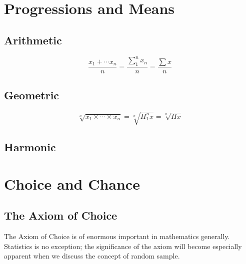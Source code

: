 \chapter{Progressions and Means}

\section{Arithmetic}
\label{sect:meanarith}

\begin{definition}
  
\end{definition}

\begin{definition}
  \[\dfrac{x_1+\cdots x_n}{n} = \dfrac{\sum_1^n x_n}{n} = \dfrac{\displaystyle\sum x}{n}\]
\end{definition}

\section{Geometric}
\label{sect:meangeom}

\begin{definition}
  
\end{definition}

\begin{definition}
  \[\sqrt[n]{x_1\times\cdots\times x_n} = \sqrt[n]{\displaystyle\Pi_1^n x} = \sqrt[n]{\displaystyle\Pi x}\]
\end{definition}
\section{Harmonic}
\label{sect:meanharmonic}

\chapter{Choice and Chance}

\section{The Axiom of Choice}

The Axiom of Choice is of enormous important in mathematics generally.
Statistics is no exception; the significance of the axiom will become
especially apparent when we discuss the concept of random sample.


